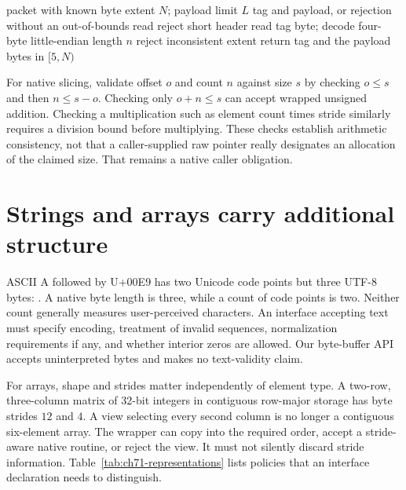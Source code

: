 \begin{algorithm}[htbp]
\caption{Decode a bounded byte record without native-structure casts.}
\label{alg:ch71-decode}
\begin{pseudocode}
\Require packet with known byte extent $N$; payload limit $L$
\Ensure tag and payload, or rejection without an out-of-bounds read
 \State reject short header \EndIf
\State read tag byte; decode four-byte little-endian length $n$
 \State reject inconsistent extent \EndIf
\State return tag and the payload bytes in $[5,N)$
\end{pseudocode}
\end{algorithm}

For native slicing, validate offset $o$ and count $n$ against size $s$ by checking $o\le s$ and then $n\le s-o$.
Checking only $o+n\le s$ can accept wrapped unsigned addition.
Checking a multiplication such as element count times stride similarly requires a division bound before multiplying.
These checks establish arithmetic consistency, not that a caller-supplied raw pointer really designates an allocation of the claimed size.
That remains a native caller obligation.

\section{Strings and arrays carry additional structure}
\label{sec:ch71-strings}
ASCII A followed by U+00E9 has two Unicode code points but three UTF-8 bytes: .
A native byte length is three, while a count of code points is two.
Neither count generally measures user-perceived characters.
An interface accepting text must specify encoding, treatment of invalid sequences, normalization requirements if any, and whether interior zeros are allowed.
Our byte-buffer API accepts uninterpreted bytes and makes no text-validity claim.

For arrays, shape and strides matter independently of element type.
A two-row, three-column matrix of 32-bit integers in contiguous row-major storage has byte strides $12$ and $4$.
A view selecting every second column is no longer a contiguous six-element array.
The wrapper can copy into the required order, accept a stride-aware native routine, or reject the view.
It must not silently discard stride information.
Table~\ref{tab:ch71-representations} lists policies that an interface declaration needs to distinguish.

